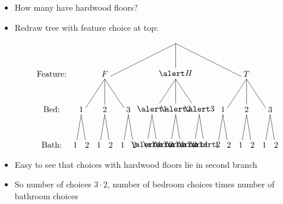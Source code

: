 \documentclass[handout]{beamer}
\theoremstyle{definition}
\begin{document}
\begin{frame}
\begin{itemize}
\item How many have hardwood floors?
\item Redraw tree with feature choice at top:
\[\begin{xy}<.5cm,0cm>:
(8.5,0)="0";
(2.5,-3)="1";
(8.5,-3)="2";
(14.5,-3)="3";
"0";"1"*+!D{F}**\dir{-};
"0";"2"*+!D{\alert H}**\dir{-};
"0";"3"*+!D{T}**\dir{-};
(.5,-6)="11";
(2.5,-6)="12";
(4.5,-6)="13";
(6.5,-6)="21";
(8.5,-6)="22";
(10.5,-6)="23";
(12.5,-6)="31";
(14.5,-6)="32";
(16.5,-6)="33";
"1";"11"*+!D{1}**\dir{-};
"1";"12"*+!D{2}**\dir{-};
"1";"13"*+!D{3}**\dir{-};
"2";"21"*+!D{\alert 1}**\dir{-};
"2";"22"*+!D{\alert 2}**\dir{-};
"2";"23"*+!D{\alert 3}**\dir{-};
"3";"31"*+!D{1}**\dir{-};
"3";"32"*+!D{2}**\dir{-};
"3";"33"*+!D{3}**\dir{-};
"11";(0,-9)*+!D{1}**\dir{-};
"11";(1,-9)*+!D{2}**\dir{-};
"12";(2,-9)*+!D{1}**\dir{-};
"12";(3,-9)*+!D{2}**\dir{-};
"13";(4,-9)*+!D{1}**\dir{-};
"13";(5,-9)*+!D{2}**\dir{-};
"21";(6,-9)*+!D{\alert 1}**\dir{-};
"21";(7,-9)*+!D{\alert 2}**\dir{-};
"22";(8,-9)*+!D{\alert 1}**\dir{-};
"22";(9,-9)*+!D{\alert 2}**\dir{-};
"23";(10,-9)*+!D{\alert 1}**\dir{-};
"23";(11,-9)*+!D{\alert 2}**\dir{-};
"31";(12,-9)*+!D{1}**\dir{-};
"31";(13,-9)*+!D{2}**\dir{-};
"32";(14,-9)*+!D{1}**\dir{-};
"32";(15,-9)*+!D{2}**\dir{-};
"33";(16,-9)*+!D{1}**\dir{-};
"33";(17,-9)*+!D{2}**\dir{-};
(-2,-3)*+!D{\text{Feature:}};
(-2,-6)*+!D{\text{Bed:}};
(-2,-9)*+!D{\text{Bath:}};
\end{xy}\]
\item Easy to see that choices with hardwood floors
lie in second branch
\item So number of choices $3\cdot 2$, number
of bedroom choices times number of bathroom choices
\end{itemize}
\end{frame}
\end{document}
